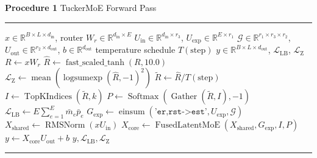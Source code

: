 \documentclass[varwidth=190mm,border=8pt]{standalone}
\begin{document}
\begin{minipage}{180mm}
\small
\noindent\textbf{Procedure 1} TuckerMoE Forward Pass\par
\vspace{2pt}\hrule\vspace{4pt}
\begin{algorithmic}[1]
\Require $x \in \mathbb{R}^{B\times L\times d_{\mathrm{in}}}$, router $W_r \in \mathbb{R}^{d_{\mathrm{in}}\times E}$
\Statex \hspace{\algorithmicindent} $U_{\mathrm{in}} \in \mathbb{R}^{d_{\mathrm{in}}\times r_3}$, $U_{\mathrm{exp}} \in \mathbb{R}^{E\times r_1}$
\Statex \hspace{\algorithmicindent} $\mathcal{G} \in \mathbb{R}^{r_1\times r_3\times r_2}$, $U_{\mathrm{out}} \in \mathbb{R}^{r_2\times d_{\mathrm{out}}}$, $b \in \mathbb{R}^{d_{\mathrm{out}}}$
\Statex \hspace{\algorithmicindent} temperature schedule $T(\mathrm{step})$
\Ensure $y \in \mathbb{R}^{B\times L\times d_{\mathrm{out}}}$, $\mathcal{L}_{\mathrm{LB}}$, $\mathcal{L}_{\mathrm{Z}}$
\State $R \gets x W_r$
\State $\widehat{R} \gets \operatorname{fast\_scaled\_tanh}(R, 10.0)$
\State $\mathcal{L}_{\mathrm{Z}} \gets \operatorname{mean}(\operatorname{logsumexp}(\widehat{R}, -1)^2)$
\State $\widetilde{R} \gets \widehat{R} / T(\mathrm{step})$
\State $I \gets \operatorname{TopKIndices}(\widetilde{R}, k)$
\State $P \gets \operatorname{Softmax}(\operatorname{Gather}(\widetilde{R}, I), -1)$
\State $\mathcal{L}_{\mathrm{LB}} \gets E \sum_{e=1}^{E} \bar{m}_e \bar{p}_e$
\State $G_{\mathrm{exp}} \gets \operatorname{einsum}(\texttt{'er,rst->est'}, U_{\mathrm{exp}}, \mathcal{G})$
\State $X_{\mathrm{shared}} \gets \operatorname{RMSNorm}(x U_{\mathrm{in}})$
\State $X_{\mathrm{core}} \gets \operatorname{FusedLatentMoE}(X_{\mathrm{shared}}, G_{\mathrm{exp}}, I, P)$
\State $y \gets X_{\mathrm{core}} U_{\mathrm{out}} + b$
\State \Return $y, \mathcal{L}_{\mathrm{LB}}, \mathcal{L}_{\mathrm{Z}}$
\end{algorithmic}
\vspace{4pt}\hrule
\end{minipage}
\end{document}
